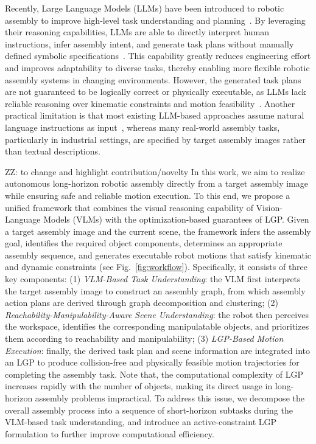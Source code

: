 \documentclass[letterpaper, 10 pt, conference]{ieeeconf}  %
\newcommand{\zz}[1]{{\color{red}ZZ: #1}}
\begin{document}
Recently, Large Language Models (LLMs) have been introduced to robotic assembly to improve high-level task understanding and planning~\cite{gkournelos2024llm,ao2025llm}. 
By leveraging their reasoning capabilities, LLMs are able to directly interpret human instructions, infer assembly intent, and generate task plans without manually defined symbolic specifications~\cite{zhou2024isr}. 
This capability greatly reduces engineering effort and improves adaptability to diverse tasks, thereby enabling more flexible robotic assembly systems in changing environments. 
However, the generated task plans are not guaranteed to be logically correct or physically executable, as LLMs lack reliable reasoning over kinematic constraints and motion feasibility~\cite{wang2025large}. 
Another practical limitation is that most existing LLM-based approaches assume natural language instructions as input~\cite{qi2026llm}, whereas many real-world assembly tasks, particularly in industrial settings, are specified by target assembly images rather than textual descriptions.

\zz{to change and highlight contribution/novelty}
In this work, we aim to realize autonomous long-horizon robotic assembly directly from a target assembly image while ensuring safe and reliable motion execution. 
To this end, we propose a unified framework that combines the visual reasoning capability of Vision-Language Models (VLMs) with the optimization-based guarantees of LGP. 
Given a target assembly image and the current scene, the framework infers the assembly goal, identifies the required object components, determines an appropriate assembly sequence, and generates executable robot motions that satisfy kinematic and dynamic constraints (see Fig.~\ref{fig:workflow}). 
Specifically, it consists of three key components: 
(1) \textit{VLM-Based Task Understanding}: the VLM first interprets the target assembly image to construct an assembly graph, from which assembly action plans are derived through graph decomposition and clustering; 
(2) \textit{Reachability-Manipulability-Aware Scene Understanding}: the robot then perceives the workspace, identifies the corresponding manipulatable objects, and prioritizes them according to reachability and manipulability; 
(3) \textit{LGP-Based Motion Execution}: finally, the derived task plan and scene information are integrated into an LGP to produce collision-free and physically feasible motion trajectories for completing the assembly task. 
Note that, the computational complexity of LGP increases rapidly with the number of objects, making its direct usage in long-horizon assembly problems impractical. 
To address this issue, we decompose the overall assembly process into a sequence of short-horizon subtasks during the VLM-based task understanding, and introduce an active-constraint LGP formulation to further improve computational efficiency.
\end{document}
